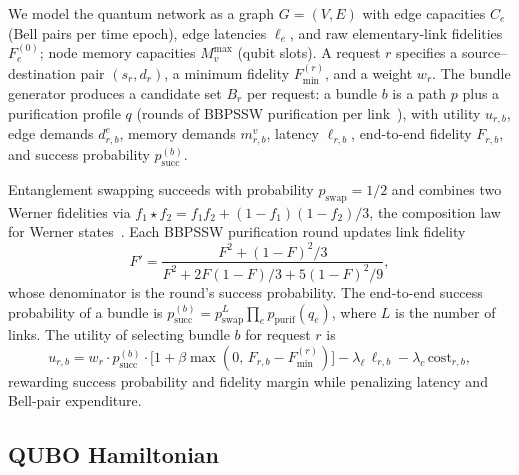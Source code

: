 \documentclass[twocolumn]{article}
\begin{document}
We model the quantum network as a graph $G=(V,E)$ with edge
capacities $C_e$ (Bell pairs per time epoch), edge latencies
$\ell_e$, and raw elementary-link fidelities $F_e^{(0)}$; node
memory capacities $M_v^{\max}$ (qubit slots).  A request $r$ specifies
a source--destination pair $(s_r,d_r)$, a minimum fidelity
$F_{\min}^{(r)}$, and a weight $w_r$.  The bundle generator produces a
candidate set $B_r$ per request: a bundle $b$ is a path $p$ plus a
purification profile $q$ (rounds of BBPSSW purification per
link~\cite{bennett1996purification}), with utility
$u_{r,b}$, edge demands $d_{r,b}^e$, memory demands $m_{r,b}^v$,
latency $\ell_{r,b}$, end-to-end fidelity $F_{r,b}$, and success
probability $p_{\text{succ}}^{(b)}$.

Entanglement swapping succeeds with probability $p_{\text{swap}}=1/2$
and combines two Werner fidelities via
$f_1 \star f_2 = f_1 f_2 + (1-f_1)(1-f_2)/3$, the composition law for
Werner states~\cite{werner1989quantum,bennett1993teleporting,
vanmeter2014quantum}.  Each BBPSSW purification round updates link
fidelity
\begin{equation}
  F' = \frac{F^2 + (1-F)^2/3}{F^2 + 2F(1-F)/3 + 5(1-F)^2/9},
\end{equation}
whose denominator is the round's success probability.  The end-to-end
success probability of a bundle is
$p_{\text{succ}}^{(b)} = p_{\text{swap}}^{L}\prod_{e}
p_{\text{purif}}(q_e)$, where $L$ is the number of links.  The utility
of selecting bundle $b$ for request $r$ is
\begin{equation}
  \label{eq:utility}
  u_{r,b} = w_r \cdot p_{\text{succ}}^{(b)} \cdot
    \bigl[1 + \beta \max(0,\, F_{r,b} - F_{\min}^{(r)})\bigr]
    - \lambda_\ell\, \ell_{r,b}
    - \lambda_c\, \text{cost}_{r,b},
\end{equation}
rewarding success probability and fidelity margin while penalizing
latency and Bell-pair expenditure.

\subsection{QUBO Hamiltonian}
\label{sec:qubo-ham}
\end{document}
